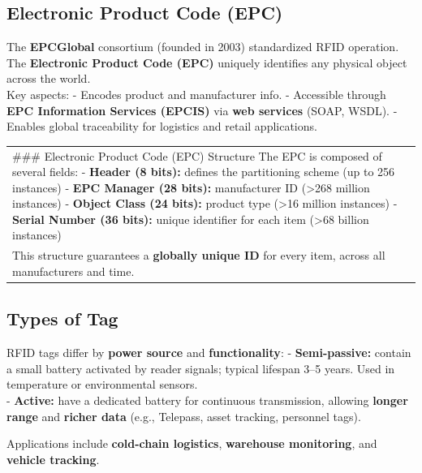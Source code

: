 \documentclass[a4paper, 12pt]{book} %
\begin{document}
\subsection{Electronic Product Code
(EPC)}\label{electronic-product-code-epc}

The \textbf{EPCGlobal} consortium (founded in 2003) standardized RFID
operation.\\
The \textbf{Electronic Product Code (EPC)} uniquely identifies any
physical object across the world.\\
Key aspects: - Encodes product and manufacturer info. - Accessible
through \textbf{EPC Information Services (EPCIS)} via \textbf{web
services} (SOAP, WSDL). - Enables global traceability for logistics and
retail applications.

\begin{longtable}[]{@{}
  >{\raggedright\arraybackslash}p{}@{}}
\toprule\noalign{}
\endhead
\bottomrule\noalign{}
\endlastfoot
\#\#\# Electronic Product Code (EPC) Structure The EPC is composed of
several fields: - \textbf{Header (8 bits):} defines the partitioning
scheme (up to 256 instances) - \textbf{EPC Manager (28 bits):}
manufacturer ID (\textgreater268 million instances) - \textbf{Object
Class (24 bits):} product type (\textgreater16 million instances) -
\textbf{Serial Number (36 bits):} unique identifier for each item
(\textgreater68 billion instances) \\
This structure guarantees a \textbf{globally unique ID} for every item,
across all manufacturers and time. \\
\end{longtable}

\subsection{Types of Tag}\label{types-of-tag}

RFID tags differ by \textbf{power source} and \textbf{functionality}: -
\textbf{Semi-passive:} contain a small battery activated by reader
signals; typical lifespan 3--5 years. Used in temperature or
environmental sensors.\\
- \textbf{Active:} have a dedicated battery for continuous transmission,
allowing \textbf{longer range} and \textbf{richer data} (e.g., Telepass,
asset tracking, personnel tags).

Applications include \textbf{cold-chain logistics}, \textbf{warehouse
monitoring}, and \textbf{vehicle tracking}.
\end{document}
